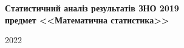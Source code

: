 \begin{titlepage}
    \begin{center}
        \begin{spacing}{1.5}
            \textbf{\Large{Статистичний аналіз результатів ЗНО 2019}} \\ 
            \vspace{1cm}\textbf{\large{предмет <<Математична статистика>>}}
        \end{spacing}
    \end{center}
    
    \vspace{\fill}
    
    \begin{center}
        \small{2022}
    \end{center}
    
\end{titlepage}
